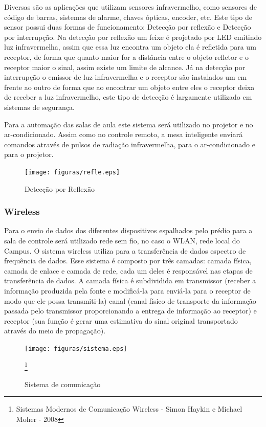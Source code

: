Diversas são as aplicações que utilizam sensores infravermelho, como sensores de
código de barras, sistemas de alarme, chaves ópticas, encoder, etc. Este tipo de
sensor possui duas formas de funcionamento: Detecção por reflexão e Detecção por
interrupção. Na detecção por reflexão um feixe é projetado por LED emitindo luz
infravermelha, assim que essa luz encontra um objeto ela é refletida para um
receptor, de forma que quanto maior for a distância entre o objeto refletor e o
receptor maior o sinal, assim existe um limite de alcance. Já na detecção por
interrupção o emissor de luz infravermelha e o receptor são instalados um em
frente ao outro de forma que ao encontrar um objeto entre eles o receptor deixa
de receber a luz infravermelho, este tipo de detecção é largamente utilizado em
sistemas de segurança.

Para a automação das salas de aula este sistema será utilizado no projetor e no
ar-condicionado. Assim como no controle remoto, a mesa inteligente enviará
comandos através de pulsos de radiação infravermelha, para o ar-condicionado e
para o projetor.

\begin{figure}[!h]
  \centering
  \texttt{[image: figuras/refle.eps]}
  \caption{Detecção por Reflexão}
\end{figure}

\subsubsection{Wireless}
Para o envio de dados dos diferentes dispositivos espalhados pelo prédio para a sala de controle será utilizado rede sem fio, no caso o WLAN, rede local do Campus. O sistema wireless utiliza para a transferência de dados espectro de frequência de dados. Esse sistema é composto por três camadas: camada física, camada de enlace e camada de rede, cada um deles é responsável nas etapas de transferência de dados. A camada física é subdividida em transmissor (receber a informação produzida pela fonte e modificá-la para enviá-la para o receptor de modo que ele possa transmiti-la) canal (canal físico de transporte da informação passada pelo transmissor proporcionando a entrega de informação ao receptor) e receptor (sua função é gerar uma estimativa do sinal original transportado através do meio de propagação).

\begin{figure}[!h]
  \centering
  \texttt{[image: figuras/sistema.eps]}
  \caption{Sistema de comunicação}\footnote{Sistemas Modernos de Comunicação Wireless - Simon Haykin e Michael Moher - 2008}
\end{figure}

